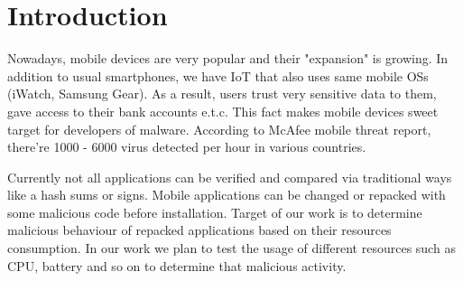 \chapter{Introduction}
Nowadays, mobile devices are very popular and their "expansion" is growing. In addition to usual smartphones, we have IoT that also uses same mobile OSs (iWatch, Samsung Gear). As a result, users trust very sensitive data to them, gave access to their bank accounts e.t.c. This fact makes mobile devices sweet target for developers of malware. According to McAfee mobile threat report, there're 1000 - 6000 virus detected per hour in various countries.
   
Currently not all applications can be verified and compared via traditional ways like a hash sums or signs. Mobile applications can be changed or repacked with some malicious code before installation. Target of our work is to determine malicious behaviour of repacked applications based on their resources consumption. In our work we plan to test the usage of different resources such as CPU, battery and so on to determine that malicious activity.